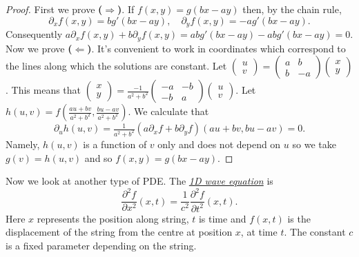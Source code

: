 \begin{proof}
    First we prove \textbf{(\(\boldsymbol\Rightarrow\))}.
    If \(f(x,y)= g(bx-ay)\) then, by the chain rule,
    \[
        \partial_x f(x,y) = bg'(bx-ay),
        \quad
        \partial_y f(x,y) = -ag'(bx-ay).
    \]
    Consequently \(a\partial_x f(x,y) + b \partial_y f(x,y) = a bg'(bx-ay) - abg'(bx-ay) = 0\).
    Now we prove \textbf{(\(\boldsymbol\Leftarrow\))}.
    It's convenient to work in coordinates which correspond to the lines along which the solutions are constant.
    Let \(\left(\begin{smallmatrix}
            u\\ v
        \end{smallmatrix}\right)
    = \left(\begin{smallmatrix}
            a & b \\ b & -a
        \end{smallmatrix}\right)
    \left(\begin{smallmatrix}
            x \\ y
        \end{smallmatrix}\right)\).
    This means that
    \(\left(\begin{smallmatrix}
            x\\ y
        \end{smallmatrix}\right)
    = \frac{-1}{a^2 + b^2} \left(\begin{smallmatrix}
            -a & -b \\ -b & a
        \end{smallmatrix}\right)
    \left(\begin{smallmatrix}
            u \\ v
        \end{smallmatrix}\right)\).
    Let \(h(u,v)=f(\frac{au + bv}{a^2 + b^2}, \frac{bu-av}{a^2+b^2})\).
    We calculate that
    \[
        \partial_u h(u,v)
        = \tfrac{1}{{a^2 + b^2}}
        \left( a \partial_x f
        + b \partial_y f \right)  (au + bv, bu-av) = 0.
    \]
    Namely, \(h(u,v)\) is a function of \(v\) only and does not depend on \(u\) so we take \(g(v) = h(u,v)\) and so \(f(x,y) = g(bx-ay)\).
\end{proof}

Now we look at another type of PDE.\@
The \href{https://en.wikipedia.org/wiki/Wave_equation}{\emph{1D wave equation}} is
\[
    \frac{\partial^2 f}{\partial x^2}(x,t) = \frac1{c^2}  \frac{\partial^2 f}{\partial t^2}(x,t).
\]
Here \(x\) represents the position along string,
\(t\) is time and \(f(x,t)\) is the displacement of the string from the centre at position \(x\), at time \(t\).
The constant \(c\) is a fixed parameter depending on the string.

